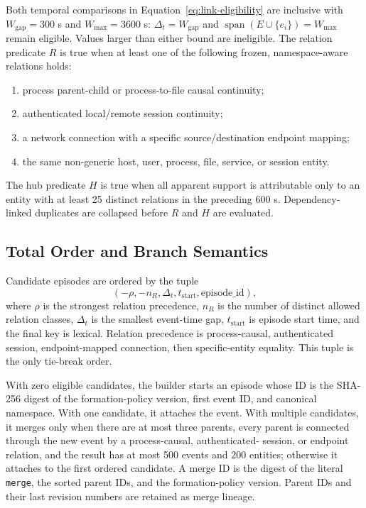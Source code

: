 Both temporal comparisons in Equation~\ref{eq:link-eligibility} are inclusive with
$W_{\mathrm{gap}}=300$ s and $W_{\max}=3600$ s:
$\Delta_t=W_{\mathrm{gap}}$ and $\operatorname{span}(E\cup\{e_i\})=W_{\max}$ remain eligible. Values larger than either bound
are ineligible. The relation predicate $R$ is true when at least one of the following frozen,
namespace-aware relations holds:
\begin{enumerate}[leftmargin=*,itemsep=1pt,topsep=2pt]
\item process parent-child or process-to-file causal continuity;
\item authenticated local/remote session continuity;
\item a network connection with a specific source/destination endpoint mapping;
\item the same non-generic host, user, process, file, service, or session entity.
\end{enumerate}
The hub predicate $H$ is true when all apparent support is attributable only to an entity with
at least 25 distinct relations in the preceding 600 s. Dependency-linked duplicates are
collapsed before $R$ and $H$ are evaluated.

\subsection{Total Order and Branch Semantics}

Candidate episodes are ordered by the tuple
\begin{equation}
(-\rho,-n_R,\Delta_t,t_{\mathrm{start}},\mathrm{episode\_id}),
\label{eq:candidate-order}
\end{equation}
where $\rho$ is the strongest relation precedence, $n_R$ is the number of distinct allowed
relation classes, $\Delta_t$ is the smallest event-time gap, $t_{\mathrm{start}}$ is episode
start time, and the final key is lexical. Relation precedence is process-causal, authenticated
session, endpoint-mapped connection, then specific-entity equality. This tuple is the only
tie-break order.

With zero eligible candidates, the builder starts an episode whose ID is the SHA-256 digest of
the formation-policy version, first event ID, and canonical namespace. With one candidate, it
attaches the event. With multiple candidates, it merges only when there are at most three
parents, every parent is connected through the new event by a process-causal, authenticated-
session, or endpoint relation, and the result has at most 500 events and 200 entities;
otherwise it attaches to the first ordered candidate. A merge ID is the digest of the literal \texttt{merge}, the sorted parent IDs, and
the formation-policy version. Parent IDs and their last revision numbers are retained as merge
lineage.


